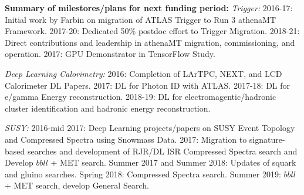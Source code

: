 
{\bf Summary of milestores/plans for next funding period:} {\em Trigger:}
2016-17: Initial work by Farbin on migration of ATLAS Trigger to Run 3
athenaMT Framework.  2017-20: Dedicated 50\% postdoc effort to Trigger
Migration. 2018-21: Direct contributions and leadership in athenaMT
migration, commissioning, and operation.  2017: GPU Demonstrator in
TensorFlow Study.

{\em Deep Learning Calorimetry:} 2016: Completion of LArTPC, NEXT, and LCD
Calorimeter DL Papers. 2017: DL for Photon ID with ATLAS. 2017-18: DL
for e/gamma Energy reconstruction. 2018-19: DL for
electromagentic/hadronic cluster identification and hadronic energy
reconstruction.



{\em SUSY:} 2016-mid 2017: Deep Learning projects/papers on SUSY Event
Topology and Compressed Spectra using Snowmass Data. 2017: Migration
to signature-based searches and development of RJR/DL ISR Compressed
Spectra search and Develop $bbll$ + MET search.  Summer 2017 and
Summer 2018: Updates of squark and gluino searches. Spring 2018:
Compressed Spectra search. Summer 2019: $bbll$ + MET search, develop
General Search.


